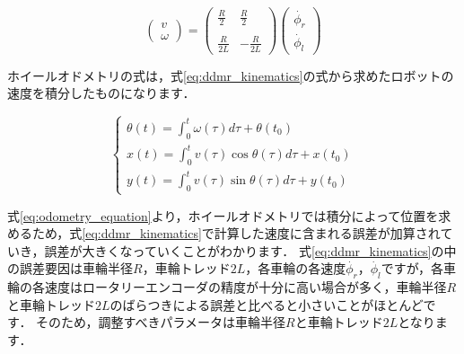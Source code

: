 \documentclass[{../../master}]{subfiles}
\begin{document}
\begin{equation}
  \begin{pmatrix}
    v \\
    \omega
  \end{pmatrix}
  =
  \begin{pmatrix}
    \displaystyle \frac{R}{2} & \displaystyle \frac{R}{2} \\ \\
    \displaystyle \frac{R}{2L} & \displaystyle -\frac{R}{2L}
  \end{pmatrix}
  \begin{pmatrix}
    \dot{\phi_{r}} \\
    \dot{\phi_{l}}
  \end{pmatrix}
  \label{eq:ddmr_kinematics_in_matrix}
\end{equation}

ホイールオドメトリの式は，式\ref{eq:ddmr_kinematics}の式から求めたロボットの速度を積分したものになります．

\begin{equation}
  \begin{cases}
    \theta (t) = \displaystyle \int_0^t \omega(\tau)d\tau + \theta (t_0) \\
    x(t) = \displaystyle \int_0^t v(\tau)\cos{\theta (\tau)}d\tau + x(t_0) \\
    y(t) = \displaystyle \int_0^t v(\tau)\sin{\theta (\tau)}d\tau + y(t_0)
  \end{cases}
  \label{eq:odometry_equation}
\end{equation}

式\ref{eq:odometry_equation}より，ホイールオドメトリでは積分によって位置を求めるため，式\ref{eq:ddmr_kinematics}で計算した速度に含まれる誤差が加算されていき，誤差が大きくなっていくことがわかります．
式\ref{eq:ddmr_kinematics}の中の誤差要因は車輪半径$R$，車輪トレッド$2L$，各車輪の各速度$\dot{\phi_{r}}$，$\dot{\phi_{l}}$ですが，各車輪の各速度はロータリーエンコーダの精度が十分に高い場合が多く，車輪半径$R$と車輪トレッド$2L$のばらつきによる誤差と比べると小さいことがほとんどです．
そのため，調整すべきパラメータは車輪半径$R$と車輪トレッド$2L$となります．
\end{document}
